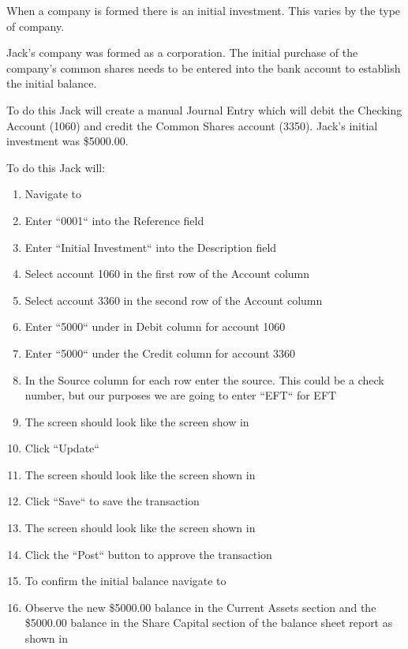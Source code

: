 When a company is formed there is an initial investment. This varies by the type of company.

Jack's company was formed as a corporation. 
The initial purchase of the company's  common shares needs to be entered
into the bank account to establish the initial balance.

To do this Jack will create a manual Journal Entry which will debit the Checking Account (1060) and credit the
Common Shares account (3350). Jack's initial investment was \$5000.00.

To do this Jack will:
\begin{enumerate}
\item Navigate to 
\item Enter ``0001`` into the Reference field
\item Enter ``Initial Investment`` into the Description field
\item Select account 1060 in the first row of the Account column
\item Select account 3360 in the second row of the Account column
\item Enter ``5000`` under in Debit column for account 1060
\item Enter ``5000`` under the Credit column for account 3360
\item In the Source column for each row enter the source. This could be a check number, but our purposes we are going to enter ``EFT`` for \gls{EFT}
\item The screen should look like the screen show in 
\item Click ``Update``
\item The screen should look like the screen shown in  
\item Click ``Save`` to save the transaction
\item The screen should look like the screen shown in 
\item Click the ``Post`` button to approve the transaction
\item To confirm the initial balance navigate to 
\item Observe the new \$5000.00 balance in the Current Assets section and the \$5000.00 balance in the 
Share Capital section of the balance sheet report as shown in 
\end{enumerate}

